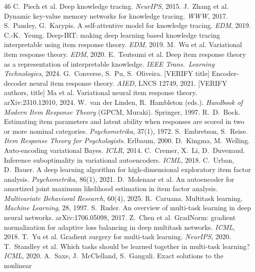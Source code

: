 \documentclass[twocolumn,10pt]{article}
\begin{document}
\small
\begin{thebibliography}{46}
 C.~Piech et al. Deep knowledge tracing. \emph{NeurIPS}, 2015.
 J.~Zhang et al. Dynamic key-value memory networks for knowledge tracing.
\emph{WWW}, 2017.
 S.~Pandey, G.~Karypis. A self-attentive model for knowledge tracing.
\emph{EDM}, 2019.
 C.-K.~Yeung. Deep-IRT: making deep learning based knowledge tracing
interpretable using item response theory. \emph{EDM}, 2019.
 M.~Wu et al. Variational item response theory. \emph{EDM}, 2020.
 E.~Tsutsumi et al. Deep item response theory as a representation of
interpretable knowledge. \emph{IEEE Trans.\ Learning Technologies}, 2024.
 G.~Converse, S.~Pu, S.~Oliveira. [VERIFY title] Encoder-decoder neural
item response theory. \emph{AIED}, LNCS 12749, 2021.
 [VERIFY authors, title] Ma et al. Variational neural item response theory.
arXiv:2310.12010, 2024.
 W.~van der Linden, R.~Hambleton (eds.). \emph{Handbook of Modern
Item Response Theory} (GPCM, Muraki). Springer, 1997.
 R.~D.~Bock. Estimating item parameters and latent ability when responses
are scored in two or more nominal categories. \emph{Psychometrika}, 37(1), 1972.
 S.~Embretson, S.~Reise. \emph{Item Response Theory for
Psychologists}. Erlbaum, 2000.
 D.~Kingma, M.~Welling. Auto-encoding variational Bayes. \emph{ICLR},
2014.
 C.~Cremer, X.~Li, D.~Duvenaud. Inference suboptimality in variational
autoencoders. \emph{ICML}, 2018.
 C.~Urban, D.~Bauer. A deep learning algorithm for high-dimensional
exploratory item factor analysis. \emph{Psychometrika}, 86(1), 2021.
 D.~Molenaar et al. An autoencoder for amortized joint maximum
likelihood estimation in item factor analysis. \emph{Multivariate Behavioral Research},
60(4), 2025.
 R.~Caruana. Multitask learning. \emph{Machine Learning}, 28, 1997.
 S.~Ruder. An overview of multi-task learning in deep neural networks.
arXiv:1706.05098, 2017.
 Z.~Chen et al. GradNorm: gradient normalization for adaptive loss
balancing in deep multitask networks. \emph{ICML}, 2018.
 T.~Yu et al. Gradient surgery for multi-task learning. \emph{NeurIPS}, 2020.
 T.~Standley et al. Which tasks should be learned together in
multi-task learning? \emph{ICML}, 2020.
 A.~Saxe, J.~McClelland, S.~Ganguli. Exact solutions to the nonlinear

\end{thebibliography}
\end{document}

